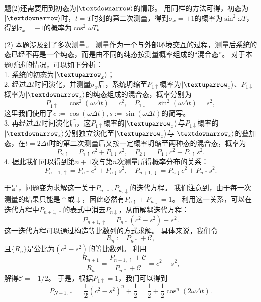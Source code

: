 \begin{tcolorbox}[breakable, title={\textbf{趣题：量子Zeno效应}}]
    题(2)还需要用到初态为$\ket{↓}$的情形。
    用同样的方法可得，初态为$\ket{↓}$时，$t=T$时刻的第二次测量，得到$σ_x=+1$的概率为$\sin^2 ωT$，得到$σ_x=-1$的概率为$\cos^2 ωT$。
    \vspace{1em}

    (2)
    本题涉及到了多次测量。
    测量作为一个与外部环境交互的过程，测量后系统的态已经不再是一个纯态，而是由不同的纯态按测量概率组成的``混合态''。
    对于本题所述的情况，可以如下分析：\\
    1. 系统的初态为$\ket{↑_x}$；\\
    2. 经过$Δt$时间演化，并测量$σ_x$后，系统坍缩至$P_{1↑}$概率为$\ket{↑_x}$、$P_{1↓}$概率为$\ket{↓_x}$的纯态组成的混合态，概率分别为
    \begin{equation}
        P_{1↑} = \cos^2(ωΔt) = c^2,\quad P_{1↓} = \sin^2(ωΔt) = s^2,
    \end{equation}
    这里我们使用了$c:=\cos(ωΔt), s:=\sin(ωΔt)$的简写。\\
    3. 再经过$Δt$时间演化后，这$P_{1↑}$概率的$\ket{↑_x}$与$P_{1↓}$概率的$\ket{↓_x}$分别独立演化至$\ket{↑_x}$与$\ket{↓_x}$的叠加态，在$t=2Δt$时的第二次测量后又按一定概率坍缩至两种态的混合态，概率为
    \begin{equation}
        P_{2↑} = P_{1↑} c^2 + P_{1↓} s^2,\quad P_{2↓} = P_{1↓} c^2 + P_{1↑} s^2.
    \end{equation}
    4. 据此我们可以得到第$n+1$次与第$n$次测量所得概率分布的关系：
    \begin{equation}
        P_{n+1,↑} = P_{n↑} c^2 + P_{n↓} s^2,\quad P_{n+1,↓} = P_{n↓} c^2 + P_{n↑} s^2.
    \end{equation}

    于是，问题变为求解这一关于$P_{n,↑},P_{n,↓}$的迭代方程。
    我们注意到，由于每一次测量的结果只能是$↑$或$↓$，因此必然有$P_{n↑}+P_{n↓}=1$。
    利用这一关系，可以在迭代方程中$P_{n+1,↑}$的表式中消去$P_{n↓}$，从而解耦迭代方程：
    \begin{equation}
        P_{n+1,↑} = P_{n↑}(c^2-s^2) + s^2.
    \end{equation}
    这一迭代方程可以通过构造等比数列的方式求解。
    具体来说，我们令
    \begin{equation}
        R_n := P_{n↑} + 𝒞,
    \end{equation}
    且$\{R_n\}$是公比为$(c^2-s^2)$的等比数列。
    利用
    \begin{equation}
        \frac{R_{n+1}}{R_n} = \frac{P_{n+1,↑}+𝒞}{P_{n↑}+𝒞} = c^2-s^2,
    \end{equation}
    解得$𝒞=-1/2$。
    于是，根据$P_{1↑}=1$，我们可以得到
    \begin{equation}
        P_{N+1,↑} = \frac12(c^2-s^2)^n + \frac12 = \frac12+\frac12\cos^n(2ωΔt).
    \end{equation}
    \vspace{1em}


\end{tcolorbox}
